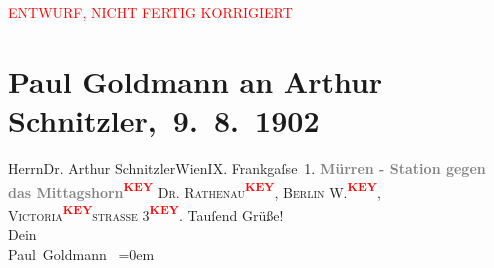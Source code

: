 
\begin{center}
            \textcolor{red}{ENTWURF, NICHT FERTIG KORRIGIERT}
                      \end{center}
            
         \renewcommand{\erwaehnteOrte}{Orte: Frankgasse, Mürren, Wien}
         \renewcommand{\erwaehnteWerke}{}
               \section[ Paul Goldmann an Arthur Schnitzler, 9. 8. 1902]{ Paul Goldmann an Arthur Schnitzler, 9. 8. 1902}\nopagebreak{}\rehead{ }\begin{ledgroupsized}[t]{13cm}\normalsize\beginnumbering \toendnotes[C]{\smallbreak\pagebreak[2]} 
\pstart{}{\pb}Herrn\pend{}\pstart{}Dr. Arthur Schnitzler\pend{}\pstart{}Wien\pend{}\pstart{}IX. Frankgaſse 1.\pend{}{\bigskip}\pstart
           \noindent{}{\pb}\textcolor{gray}{\textbf{Mürren - Station gegen das Mittagshorn\textcolor{red}{\textsuperscript{\textbf{KEY}}}}}\pend
           \pstart
           \textsc{Dr. Rathenau\textcolor{red}{\textsuperscript{\textbf{KEY}}}}, \textsc{Berlin W.\textcolor{red}{\textsuperscript{\textbf{KEY}}}}, \textsc{Victoria\textcolor{red}{\textsuperscript{\textbf{KEY}}}}\textsc{straſse} 3\textcolor{red}{\textsuperscript{\textbf{KEY}}}. Tauſend Grüße! {\\}Dein\pend
           \pstart
           {\\[\baselineskip]}\spacefill\mbox{Paul Goldmann }\pend
           \leftskip=0em{}
         
         \endnumbering{}\end{ledgroupsized}\begin{anhang}\end{anhang}\newcommand{\dateiname}{L03218}\newcommand{\titel}{Paul Goldmann an Arthur Schnitzler, 9. 8. 1902}\newcommand{\editorInnen}{Martin Anton Müller und Laura Untner}
      